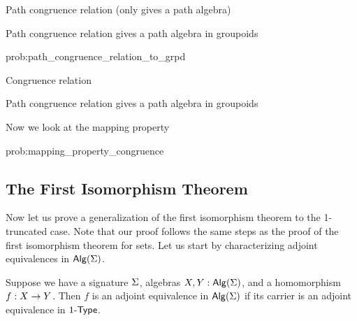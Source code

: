 \begin{definition}
Path congruence relation (only gives a path algebra)
\end{definition}

\begin{problem}
\label{prob:path_congruence_relation_to_grpd}
Path congruence relation gives a path algebra in groupoids
\end{problem}

\begin{construction}{prob:path_congruence_relation_to_grpd}

\end{construction}

\begin{definition}
Congruence relation
\end{definition}

\begin{problem}
\label{prob:congruence_relation_to_grpd}
Path congruence relation gives a path algebra in groupoids
\end{problem}

Now we look at the mapping property

\begin{problem}
\label{prob:mapping_property_congruence}

\end{problem}

\begin{construction}{prob:mapping_property_congruence}
\label{constr:mapping_property_congruence}

\end{construction}

\subsection{The First Isomorphism Theorem}
Now let us prove a generalization of the first isomorphism theorem to the 1-truncated case.
Note that our proof follows the same steps as the proof of the first isomorphism theorem for sets.
Let us start by characterizing adjoint equivalences in $\mathsf{Alg}(\Sigma)$.

\begin{proposition}
\label{prop:algebra_adjequiv}
Suppose we have a signature $\Sigma$, algebras $X, Y : \mathsf{Alg}(\Sigma)$, and a homomorphism $f : X \rightarrow Y$.
Then $f$ is an adjoint equivalence in $\mathsf{Alg}(\Sigma)$ if its carrier is an adjoint equivalence in $1\mbox{-}\mathsf{Type}$.
\end{proposition}

